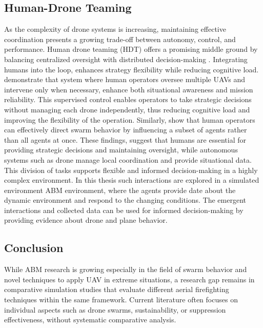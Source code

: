 \documentclass[twoside]{article}
\begin{document}
\subsection{Human-Drone Teaming}

As the complexity of drone systems is increasing, maintaining effective coordination presents a growing trade-off between autonomy, control, and performance. Human drone teaming (HDT) offers a promising middle ground by balancing centralized oversight with distributed decision-making \citep{asavasirikulkij2023human_Workload}. Integrating humans into the loop, enhances strategy flexibility while reducing cognitive load. \citet{SAT_first} demonstrate that system where human operators oversee multiple UAVs and intervene only when necessary, enhance both situational awareness and mission reliability. This supervised control enables operators to take strategic decisions without managing each drone independently, thus reducing cognitive load and improving the flexibility of the operation. Similarly, \citet*{lewisHumanFactorsIssues2012} show that human operators can effectively direct swarm behavior by influencing a subset of agents rather than all agents at once.
These findings, suggest that humans are essential for providing strategic decisions and maintaining oversight, while autonomous systems such as drone manage local coordination and provide situational data. This division of tasks supports flexible and informed decision-making in a highly complex environment.
In this thesis such interactions are explored in a simulated environment ABM environment, where the agents provide date about the dynamic environment and respond to the changing conditions. The emergent interactions and collected data can be used for informed decision-making by providing evidence about drone and plane behavior.

\subsection{Conclusion}

While ABM research is growing especially in the field of swarm behavior and novel techniques to apply UAV in extreme situations, a research gap remains in comparative simulation studies that evaluate different aerial firefighting techniques within the same framework. Current literature often focuses on individual aspects such as drone swarms, sustainability, or suppression effectiveness, without systematic comparative analysis.
\end{document}
